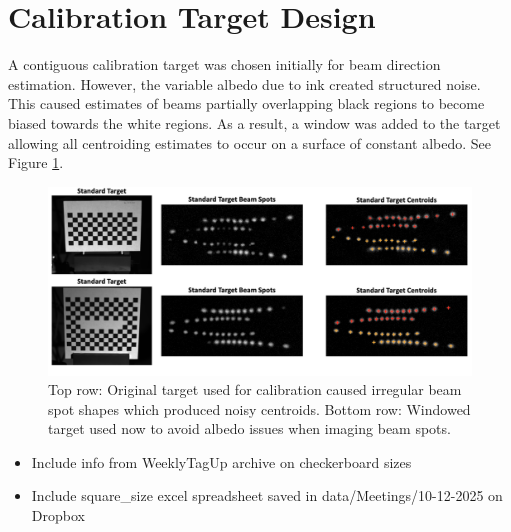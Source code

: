 \section{Calibration Target Design} \label{appx:calibration_checkerboard_design}
A contiguous calibration target was chosen initially for beam direction estimation. However, the variable albedo due to ink created structured noise. This caused estimates of beams partially overlapping black regions to become biased towards the white regions. As a result, a window was added to the target allowing all centroiding estimates to occur on a surface of constant albedo. See Figure \ref{fig:target_window}.

\begin{figure}
    \centering
    \includegraphics[width=\linewidth]{../figures/CalTarget_Std_vs_Windowed.png}
    \caption{Top row: Original target used for calibration caused irregular beam spot shapes which produced noisy centroids. Bottom row: Windowed target used now to avoid albedo issues when imaging beam spots.}
    \label{fig:target_window}
\end{figure}


\begin{itemize}
    \item Include info from WeeklyTagUp archive on checkerboard sizes
    \item Include square\_size excel spreadsheet saved in data/Meetings/10-12-2025 on Dropbox
\end{itemize}
